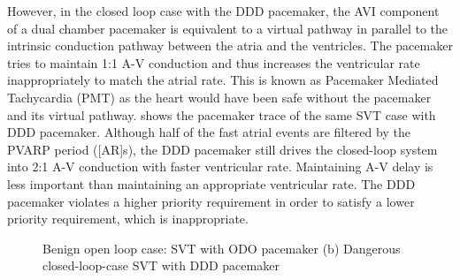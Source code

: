 However, in the closed loop case with the DDD pacemaker, the AVI component of a dual chamber pacemaker is equivalent to a virtual pathway in parallel to the intrinsic conduction pathway between the atria and the ventricles. The pacemaker tries to maintain 1:1 A-V conduction and thus increases the ventricular rate inappropriately to match the atrial rate.  This is known as Pacemaker Mediated Tachycardia (PMT) as the heart would have been safe without the pacemaker and its virtual pathway.  shows the pacemaker trace of the same SVT case with DDD pacemaker. Although half of the fast atrial events are filtered by the PVARP period ([AR]s), the DDD pacemaker still drives the closed-loop system into 2:1 A-V conduction with faster ventricular rate. Maintaining A-V delay is less important than maintaining an appropriate ventricular rate. The DDD pacemaker violates a higher priority requirement in order to satisfy a lower priority requirement, which is inappropriate.
\begin{figure}[!t]
\centering
\vspace{-10pt}
		
\vspace{-10pt}
\caption{\small Benign open loop case: SVT with ODO pacemaker (b) Dangerous closed-loop-case SVT with DDD pacemaker}
\end{figure} 

